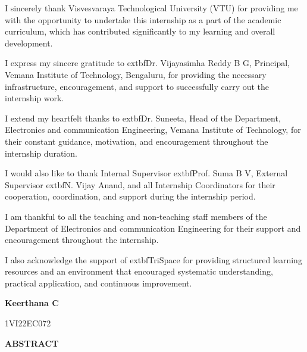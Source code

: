 \documentclass[12pt,a4paper]{report}
\begin{document}
\vspace{0.5cm}
\setlength{\parskip}{1em}
\begin{onehalfspacing}
I sincerely thank Visvesvaraya Technological University (VTU) for providing me with the opportunity to undertake this internship as a part of the academic curriculum, which has contributed significantly to my learning and overall development.

I express my sincere gratitude to 	extbf{Dr. Vijayasimha Reddy B G}, Principal, Vemana Institute of Technology, Bengaluru, for providing the necessary infrastructure, encouragement, and support to successfully carry out the internship work.

I extend my heartfelt thanks to 	extbf{Dr. Suneeta}, Head of the Department, Electronics and communication Engineering, Vemana Institute of Technology, for their constant guidance, motivation, and encouragement throughout the internship duration.

I would also like to thank Internal Supervisor 	extbf{Prof. Suma B V}, External Supervisor 	extbf{N. Vijay Anand}, and all Internship Coordinators for their cooperation, coordination, and support during the internship period.

I am thankful to all the teaching and non-teaching staff members of the Department of Electronics and communication Engineering for their support and encouragement throughout the internship.

I also acknowledge the support of 	extbf{TriSpace} for providing structured learning resources and an environment that encouraged systematic understanding, practical application, and continuous improvement.
\end{onehalfspacing}
\setlength{\parskip}{0.4em}

\vspace{1cm}
\begin{flushright}
\textbf{Keerthana C}\par
1VI22EC072\par
\end{flushright}

\newpage
\begin{center}
{\LARGE \textbf{ABSTRACT}\par}
\end{center}

\vspace{0.5cm}
\setlength{\parindent}{1.5em}
\end{document}
